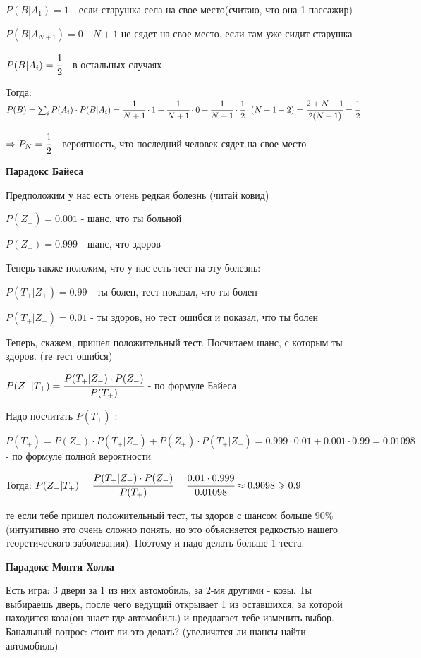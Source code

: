 \documentclass[a4paper]{article}
\begin{document}
\begin{colloq}
	$P(B | A_1) = 1$ - если старушка села на свое место(считаю, что она 1 пассажир)
	
	$P(B | A_{N+1}) = 0$ - $N+1$ не сядет на свое место, если там уже сидит старушка
	
	$P(B | A_i) = \cfrac 12$ - в остальных случаях 
	
	Тогда: $P(B) = \sum_i P(A_i) \cdot P(B | A_i) = \cfrac 1{N+1} \cdot 1 + \cfrac 1{N+1} \cdot 0 + \cfrac 1{N+1} \cdot \cfrac 12 \cdot (N+1 - 2) = \cfrac {2 + N-1}{2(N+1)} = \cfrac 12$
	
	$\Rightarrow P_N = \cfrac 12$ - вероятность, что последний человек сядет на свое место 
	
	\textbf{Парадокс Байеса}
	
	Предположим у нас есть очень редкая болезнь (читай ковид) 
	
	$P(Z_+) = 0.001$ - шанс, что ты больной
	
	$P(Z_-) = 0.999$ - шанс,  что здоров
	
	Теперь также положим, что у нас есть тест на эту болезнь:
	
	$P(T_+ | Z_+) = 0.99$ - ты болен, тест показал,  что ты болен
	
	$P(T_+ | Z_-) = 0.01$ - ты здоров, но тест ошибся и показал, что ты болен
	
	Теперь, скажем, пришел положительный тест. Посчитаем шанс, с которым ты здоров. (те тест ошибся)
	
	$P(Z_- | T_+) = \cfrac{P(T_+ | Z_-) \cdot P(Z_-)}{P(T_+)}$ - по формуле Байеса
	
	Надо посчитать $P(T_+)$ :
	
	$P(T_+) = P(Z_-) \cdot P(T_+ | Z_-) + P(Z_+) \cdot P(T_+ | Z_+) = 0.999 \cdot 0.01 + 0.001 \cdot 0.99 = 0.01098$ - по формуле полной вероятности
	
	Тогда: $P(Z_- | T_+) = \cfrac{P(T_+ | Z_-) \cdot P(Z_-)}{P(T_+)}  = \cfrac{0.01 \cdot 0.999}{0.01098} \approx 0.9098 \geq 0.9$ 
	
	те если тебе пришел положительный тест, ты здоров с шансом больше $90\%$(интуитивно это очень сложно понять, но это объясняется редкостью нашего теоретического заболевания). Поэтому и надо делать больше 1 теста.
	
	\textbf{Парадокс Монти Холла}
	
	Есть игра: 3 двери за 1 из них автомобиль, за 2-мя другими - козы. Ты выбираешь дверь, после чего ведущий открывает 1 из оставшихся, за которой находится коза(он знает где автомобиль) и предлагает тебе изменить выбор. Банальный вопрос: стоит ли это делать? (увеличатся ли шансы найти автомобиль)
	

\end{colloq}
\end{document}
